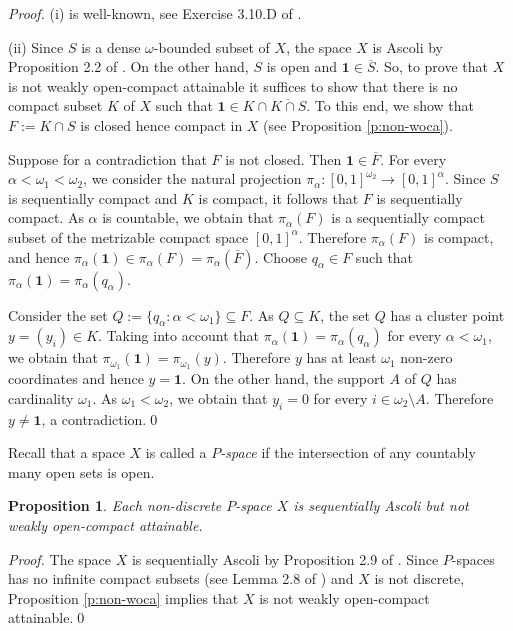 \documentclass[preprint,11pt]{elsarticle}
\newtheorem{proposition}[theorem]{Proposition}
\numberwithin{equation}{section}
\numberwithin{theorem}{section}
\newcommand{\w}{\omega}
\newcommand{\SM}{{\setminus}}
\begin{document}
\begin{proof}
(i) is well-known, see Exercise 3.10.D of \cite{Eng}.

(ii) Since $S$ is a dense $\w$-bounded subset of $X$, the space $X$ is Ascoli by Proposition 2.2 of \cite{Gabr-pseudo-Ascoli}. On the other hand, $S$ is open and $\mathbf{1}\in \overline{S}$. So, to prove that $X$ is not weakly open-compact attainable it suffices to show that there is no compact subset $K$ of $X$ such that $\mathbf{1}\in K\cap \overline{K\cap S}$. To this end,  we show that $F:=K\cap S$ is closed hence compact in $X$ (see Proposition \ref{p:non-woca}). %

Suppose for a contradiction that $F$ is not closed. Then $\mathbf{1}\in \overline{F}$.  For every $\alpha<\w_1 <\w_2$, we consider  the natural projection $\pi_\alpha:[0,1]^{\w_2} \to [0,1]^\alpha$. Since $S$ is sequentially compact and $K$ is compact, it follows that $F$ is sequentially compact. As $\alpha$ is countable, we obtain that $\pi_\alpha(F)$ is a sequentially compact subset of the metrizable compact space $[0,1]^\alpha$. Therefore $\pi_\alpha(F)$ is compact, and hence $\pi_\alpha(\mathbf{1})\in \pi_\alpha(F)=\pi_\alpha(\overline{F})$. Choose $q_\alpha\in F$ such that $\pi_\alpha(\mathbf{1})=\pi_\alpha(q_\alpha)$.

Consider the set $Q:=\{q_\alpha: \alpha<\w_1\}\subseteq F$. As $Q\subseteq K$, the set $Q$ has a cluster point $y=(y_i)\in K$. Taking into account that $\pi_\alpha(\mathbf{1})=\pi_\alpha(q_\alpha)$ for every $\alpha<\w_1$, we obtain that $\pi_{\w_1}(\mathbf{1})=\pi_{\w_1}(y)$. Therefore $y$ has at least $\w_1$ non-zero coordinates and hence $y=\mathbf{1}$. On the other hand, the support $A$ of $Q$ has cardinality $\w_1$. As $\w_1 <\w_2$, we obtain that $y_i=0$ for every $i\in\w_2\SM A$. Therefore $y\not=\mathbf{1}$, a contradiction.\qed
\end{proof}

Recall that a space $X$ is called a {\em $P$-space} if  the intersection of any countably many open sets is open.

\begin{proposition} \label{p:seq-Ascoli-non-woca}
Each non-discrete $P$-space $X$ is sequentially Ascoli but not weakly open-compact attainable.
\end{proposition}

\begin{proof}
The space $X$ is sequentially Ascoli by Proposition 2.9 of  \cite{Gabr:weak-bar-L(X)}. Since $P$-spaces has no infinite compact subsets (see Lemma 2.8 of \cite{Gabr:weak-bar-L(X)}) and $X$ is not discrete, Proposition \ref{p:non-woca} implies that $X$ is not weakly open-compact attainable.\qed
\end{proof}
\end{document}
